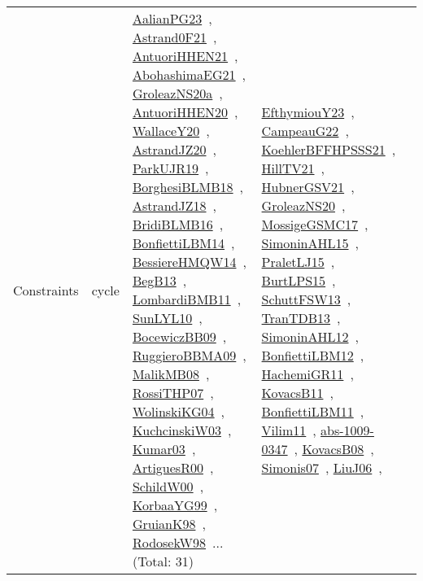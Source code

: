 {\begin{longtable}{lp{3cm}>{\raggedright\arraybackslash}p{6cm}>{\raggedright\arraybackslash}p{6cm}>{\raggedright\arraybackslash}p{8cm}}
Constraints & cycle & \href{works/AalianPG23.pdf}{AalianPG23}~\cite{AalianPG23}, \href{works/Astrand0F21.pdf}{Astrand0F21}~\cite{Astrand0F21}, \href{works/AntuoriHHEN21.pdf}{AntuoriHHEN21}~\cite{AntuoriHHEN21}, \href{works/AbohashimaEG21.pdf}{AbohashimaEG21}~\cite{AbohashimaEG21}, \href{works/GroleazNS20a.pdf}{GroleazNS20a}~\cite{GroleazNS20a}, \href{works/AntuoriHHEN20.pdf}{AntuoriHHEN20}~\cite{AntuoriHHEN20}, \href{works/WallaceY20.pdf}{WallaceY20}~\cite{WallaceY20}, \href{works/AstrandJZ20.pdf}{AstrandJZ20}~\cite{AstrandJZ20}, \href{works/ParkUJR19.pdf}{ParkUJR19}~\cite{ParkUJR19}, \href{works/BorghesiBLMB18.pdf}{BorghesiBLMB18}~\cite{BorghesiBLMB18}, \href{works/AstrandJZ18.pdf}{AstrandJZ18}~\cite{AstrandJZ18}, \href{works/BridiBLMB16.pdf}{BridiBLMB16}~\cite{BridiBLMB16}, \href{works/BonfiettiLBM14.pdf}{BonfiettiLBM14}~\cite{BonfiettiLBM14}, \href{works/BessiereHMQW14.pdf}{BessiereHMQW14}~\cite{BessiereHMQW14}, \href{works/BegB13.pdf}{BegB13}~\cite{BegB13}, \href{works/LombardiBMB11.pdf}{LombardiBMB11}~\cite{LombardiBMB11}, \href{works/SunLYL10.pdf}{SunLYL10}~\cite{SunLYL10}, \href{works/BocewiczBB09.pdf}{BocewiczBB09}~\cite{BocewiczBB09}, \href{works/RuggieroBBMA09.pdf}{RuggieroBBMA09}~\cite{RuggieroBBMA09}, \href{works/MalikMB08.pdf}{MalikMB08}~\cite{MalikMB08}, \href{works/RossiTHP07.pdf}{RossiTHP07}~\cite{RossiTHP07}, \href{works/WolinskiKG04.pdf}{WolinskiKG04}~\cite{WolinskiKG04}, \href{works/KuchcinskiW03.pdf}{KuchcinskiW03}~\cite{KuchcinskiW03}, \href{works/Kumar03.pdf}{Kumar03}~\cite{Kumar03}, \href{works/ArtiguesR00.pdf}{ArtiguesR00}~\cite{ArtiguesR00}, \href{works/SchildW00.pdf}{SchildW00}~\cite{SchildW00}, \href{works/KorbaaYG99.pdf}{KorbaaYG99}~\cite{KorbaaYG99}, \href{works/GruianK98.pdf}{GruianK98}~\cite{GruianK98}, \href{works/RodosekW98.pdf}{RodosekW98}~\cite{RodosekW98}... (Total: 31) & \href{works/EfthymiouY23.pdf}{EfthymiouY23}~\cite{EfthymiouY23}, \href{works/CampeauG22.pdf}{CampeauG22}~\cite{CampeauG22}, \href{works/KoehlerBFFHPSSS21.pdf}{KoehlerBFFHPSSS21}~\cite{KoehlerBFFHPSSS21}, \href{works/HillTV21.pdf}{HillTV21}~\cite{HillTV21}, \href{works/HubnerGSV21.pdf}{HubnerGSV21}~\cite{HubnerGSV21}, \href{works/GroleazNS20.pdf}{GroleazNS20}~\cite{GroleazNS20}, \href{works/MossigeGSMC17.pdf}{MossigeGSMC17}~\cite{MossigeGSMC17}, \href{works/SimoninAHL15.pdf}{SimoninAHL15}~\cite{SimoninAHL15}, \href{works/PraletLJ15.pdf}{PraletLJ15}~\cite{PraletLJ15}, \href{works/BurtLPS15.pdf}{BurtLPS15}~\cite{BurtLPS15}, \href{works/SchuttFSW13.pdf}{SchuttFSW13}~\cite{SchuttFSW13}, \href{works/TranTDB13.pdf}{TranTDB13}~\cite{TranTDB13}, \href{works/SimoninAHL12.pdf}{SimoninAHL12}~\cite{SimoninAHL12}, \href{works/BonfiettiLBM12.pdf}{BonfiettiLBM12}~\cite{BonfiettiLBM12}, \href{works/HachemiGR11.pdf}{HachemiGR11}~\cite{HachemiGR11}, \href{works/KovacsB11.pdf}{KovacsB11}~\cite{KovacsB11}, \href{works/BonfiettiLBM11.pdf}{BonfiettiLBM11}~\cite{BonfiettiLBM11}, \href{works/Vilim11.pdf}{Vilim11}~\cite{Vilim11}, \href{works/abs-1009-0347.pdf}{abs-1009-0347}~\cite{abs-1009-0347}, \href{works/KovacsB08.pdf}{KovacsB08}~\cite{KovacsB08}, \href{works/Simonis07.pdf}{Simonis07}~\cite{Simonis07}, \href{works/LiuJ06.pdf}{LiuJ06}~\cite{LiuJ06}, 
\end{longtable}}
